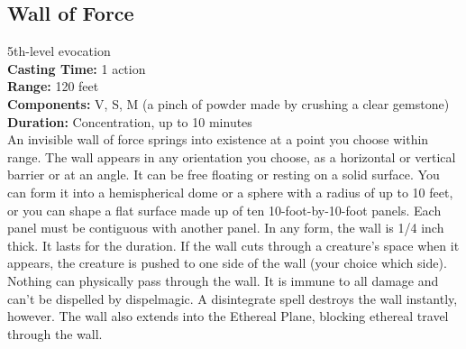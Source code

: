 \documentclass[11pt, A4paper, english]{article}
\begin{document}
		\subsection{Wall of Force}
5th-level evocation \\
\textbf{Casting Time:} 1 action \\
\textbf{Range:} 120 feet \\
\textbf{Components:} V, S, M (a pinch of powder made by crushing a clear gemstone) \\
\textbf{Duration:} Concentration, up to 10 minutes \\
An invisible wall of force springs into existence at a point you choose within range. The wall appears in any orientation you choose, as a horizontal or vertical barrier or at an angle. It can be free floating or resting on a solid surface. You can form it into a hemispherical dome or a sphere with a radius of up to 10 feet, or you can shape a flat surface made up of ten 10-foot-by-10-foot panels. Each panel must be contiguous with another panel. In any form, the wall is 1/4 inch thick. It lasts for the duration. If the wall cuts through a creature’s space when it appears, the creature is pushed to one side of the wall (your choice which side). \\
Nothing can physically pass through the wall. It is immune to all damage and can’t be dispelled by dispelmagic. A disintegrate spell destroys the wall instantly, however. The wall also extends into the Ethereal Plane, blocking ethereal travel through the wall.
\end{document}
